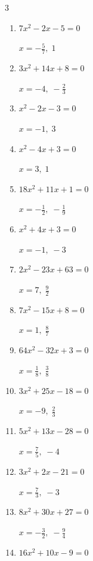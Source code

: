 \begin{multicols}{3}
\begin{enumerate}
  \item $7x^{2}-2x-5=0$

        $\displaystyle x=-\frac{5}{7},\; 1$

  \item $3x^{2}+14x+8=0$

        $\displaystyle x=-4,\; -\frac{2}{3}$

  \item $x^{2}-2x-3=0$

        $\displaystyle x=-1,\; 3$

  \item $x^{2}-4x+3=0$

        $\displaystyle x=3,\; 1$

  \item $18x^{2}+11x+1=0$

        $\displaystyle x=-\frac{1}{2},\; -\frac{1}{9}$

\columnbreak %

  \item $x^{2}+4x+3=0$

        $\displaystyle x=-1,\; -3$

  \item $2x^{2}-23x+63=0$

        $\displaystyle x=7,\; \frac{9}{2}$

  \item $7x^{2}-15x+8=0$

        $\displaystyle x=1,\; \frac{8}{7}$

  \item $64x^{2}-32x+3=0$

        $\displaystyle x=\frac{1}{8},\; \frac{3}{8}$

  \item $3x^{2}+25x-18=0$

        $\displaystyle x=-9,\; \frac{2}{3}$

  \item $5x^{2}+13x-28=0$

        $\displaystyle x=\frac{7}{5},\; -4$

  \item $3x^{2}+2x-21=0$

        $\displaystyle x=\frac{7}{3},\; -3$

  \item $8x^{2}+30x+27=0$

        $\displaystyle x=-\frac{3}{2},\; -\frac{9}{4}$

  \item $16x^{2}+10x-9=0$


\end{enumerate}
\end{multicols}

